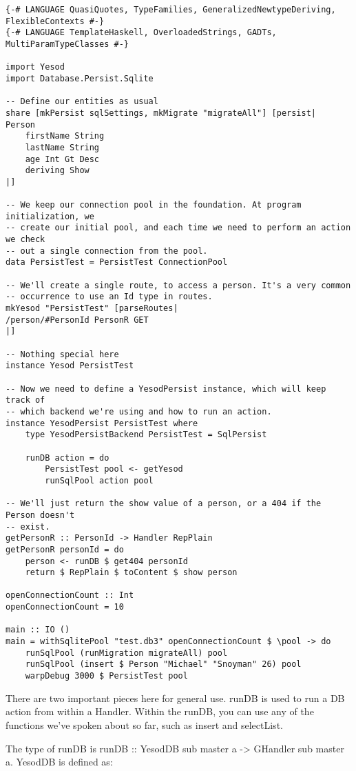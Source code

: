 \begin{lstlisting}
{-# LANGUAGE QuasiQuotes, TypeFamilies, GeneralizedNewtypeDeriving, FlexibleContexts #-}
{-# LANGUAGE TemplateHaskell, OverloadedStrings, GADTs, MultiParamTypeClasses #-}

import Yesod
import Database.Persist.Sqlite

-- Define our entities as usual
share [mkPersist sqlSettings, mkMigrate "migrateAll"] [persist|
Person
    firstName String
    lastName String
    age Int Gt Desc
    deriving Show
|]

-- We keep our connection pool in the foundation. At program initialization, we
-- create our initial pool, and each time we need to perform an action we check
-- out a single connection from the pool.
data PersistTest = PersistTest ConnectionPool

-- We'll create a single route, to access a person. It's a very common
-- occurrence to use an Id type in routes.
mkYesod "PersistTest" [parseRoutes|
/person/#PersonId PersonR GET
|]

-- Nothing special here
instance Yesod PersistTest

-- Now we need to define a YesodPersist instance, which will keep track of
-- which backend we're using and how to run an action.
instance YesodPersist PersistTest where
    type YesodPersistBackend PersistTest = SqlPersist

    runDB action = do
        PersistTest pool <- getYesod
        runSqlPool action pool

-- We'll just return the show value of a person, or a 404 if the Person doesn't
-- exist.
getPersonR :: PersonId -> Handler RepPlain
getPersonR personId = do
    person <- runDB $ get404 personId
    return $ RepPlain $ toContent $ show person

openConnectionCount :: Int
openConnectionCount = 10

main :: IO ()
main = withSqlitePool "test.db3" openConnectionCount $ \pool -> do
    runSqlPool (runMigration migrateAll) pool
    runSqlPool (insert $ Person "Michael" "Snoyman" 26) pool
    warpDebug 3000 $ PersistTest pool
\end{lstlisting}%

There are two important pieces here for general use. runDB is used to run a DB action from within a Handler. Within the runDB, you can use any of the functions we've spoken about so far, such as insert and selectList.

The type of runDB is runDB :: YesodDB sub master a -> GHandler sub master a. YesodDB is defined as:

